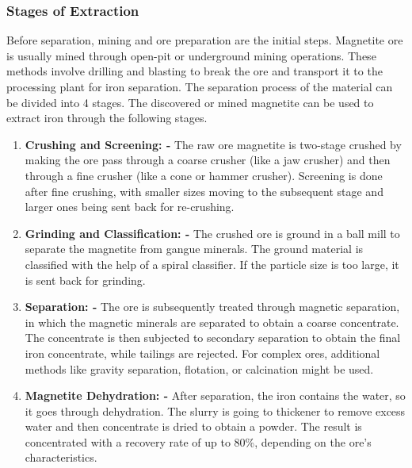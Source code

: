 \documentclass[12pt,a4paper, top=1.9cm, bottom=2.03cm, left=3.81cm, right=1.9cm]{article}
\begin{document}
\subsubsection{Stages of Extraction}
\noindent\fontsize{12}{14}\selectfont Before separation, mining and ore preparation are the initial steps. Magnetite ore is usually mined through open-pit or underground mining operations. These methods involve drilling and blasting to break the ore and transport it to the processing plant for iron separation. The separation process of the material can be divided into 4 stages. The discovered or mined magnetite can be used to extract iron through the following stages.
\begin{enumerate}[label=\arabic*.]  %
    \item \textbf{Crushing and Screening: -} The raw ore magnetite is two-stage crushed by making the ore pass through a coarse crusher (like a jaw crusher) and then through a fine crusher (like a cone or hammer crusher). Screening is done after fine crushing, with smaller sizes moving to the subsequent stage and larger ones being sent back for re-crushing.
    \item \textbf{Grinding and Classification: -} The crushed ore is ground in a ball mill to separate the magnetite from gangue minerals. The ground material is classified with the help of a spiral classifier. If the particle size is too large, it is sent back for grinding.
    \item \textbf{Separation: -} The ore is subsequently treated through magnetic separation, in which the magnetic minerals are separated to obtain a coarse concentrate. The concentrate is then subjected to secondary separation to obtain the final iron concentrate, while tailings are rejected. For complex ores, additional methods like gravity separation, flotation, or calcination might be used.
    \item \textbf{Magnetite Dehydration: -} After separation, the iron contains the water, so it goes through dehydration. The slurry is going to thickener to remove excess water and then concentrate is dried to obtain a powder. The result is concentrated with a recovery rate of up to 80\%, depending on the ore’s characteristics. 
    
\end{enumerate}
\end{document}
